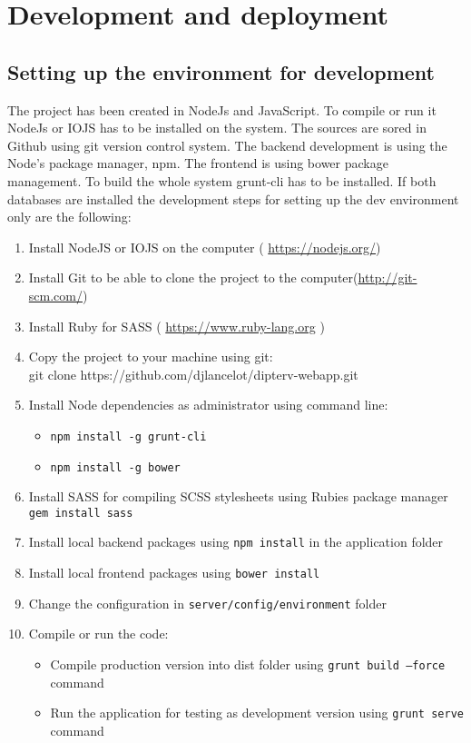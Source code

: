 \appendix
\chapter{Development and deployment}
\section*{Setting up the environment for development}
The project has been created in NodeJs and JavaScript. To compile or run it NodeJs or IOJS has to be installed on the system. The sources are sored in Github using git version control system. The backend development is using the Node's package manager, npm. The frontend is using bower package management. To build the whole system grunt-cli has to be installed. If both databases are installed the development steps for setting up the dev environment only are the following:
\begin{enumerate}
\item Install NodeJS or IOJS on the computer ( \url{https://nodejs.org/})
\item Install Git to be able to clone the project to the computer(\url{http://git-scm.com/})
\item Install Ruby for SASS ( \url{https://www.ruby-lang.org} )
\item Copy the project to your machine using git: \\
git clone https://github.com/djlancelot/dipterv-webapp.git
\item Install Node dependencies as administrator using command line: 
\begin{itemize}
\item \texttt{npm install -g grunt-cli}
\item \texttt{npm install -g bower}
\end{itemize}
\item Install SASS for compiling SCSS stylesheets using Rubies package manager \texttt{gem install sass}
\item Install local backend packages using \texttt{npm install} in the application folder
\item Install local frontend packages using \texttt{bower install}
\item Change the configuration in \texttt{server/config/environment} folder
\item Compile or run the code:
\begin{itemize}
\item Compile production version into dist folder using \texttt{grunt build --force} command
\item Run the application for testing as development version using \texttt{grunt serve} command
\end{itemize}
\end{enumerate}

